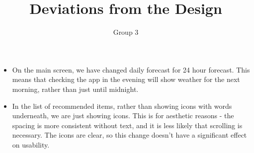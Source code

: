 \documentclass[12pt,a4paper]{article}
\title{Deviations from the Design}
\author{Group 3}
\date{}
\begin{document}
\maketitle
\thispagestyle{fancy}

\begin{itemize}
	\item
	On the main screen, we have changed daily forecast for 24 hour forecast. This means that checking the app in the evening will show weather for the next morning, rather than just until midnight.

	\item
	In the list of recommended items, rather than showing icons with words underneath, we are just showing icons. This is for aesthetic reasons - the spacing is more consistent without text, and it is less likely that scrolling is necessary. The icons are clear, so this change doesn't have a significant effect on usability. 
\end{itemize}
\end{document}
